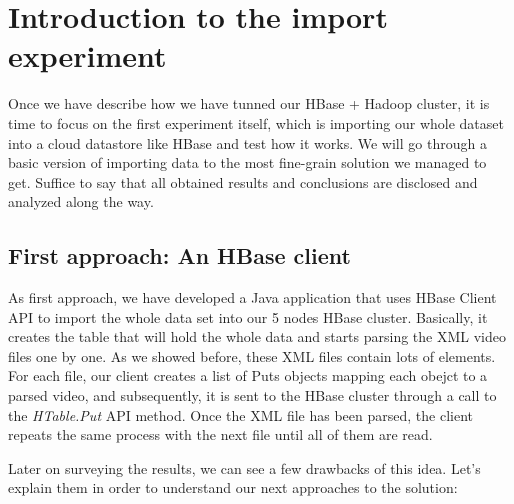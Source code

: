 \section{Introduction to the import experiment}

Once we have describe how we have tunned our HBase + Hadoop cluster, it is time to focus on the first experiment itself, which is importing our whole dataset into a cloud datastore like HBase and test how it works. We will go through a basic version of importing data to the most fine-grain solution we managed to get. Suffice to say that all obtained results and conclusions are disclosed and analyzed along the way.

\subsection{First approach: An HBase client}

As first approach, we have developed a Java application that uses HBase Client API to import the whole data set into our 5 nodes HBase cluster. Basically, it creates the table that will hold the whole data and starts parsing the XML video files one by one. As we showed before, these XML files contain lots of elements. For each file, our client creates a list of Puts objects mapping each obejct to a parsed video, and subsequently, it is sent to the HBase cluster through a call to the \textit{HTable.Put} API method. Once the XML file has been parsed, the client repeats the same process with the next file until all of them are read.
\bigskip
{}
\bigskip

Later on surveying the results, we can see a few drawbacks of this idea. Let's explain them in order to understand our next approaches to the solution:

